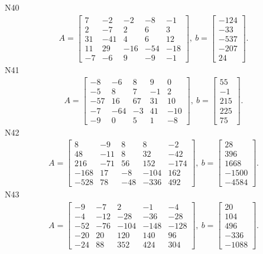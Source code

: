 \documentclass[11pt]{report}
\begin{document}
N40
\begin{align*}
 A = \left[\begin{matrix}7 & -2 & -2 & -8 & -1\\2 & -7 & 2 & 6 & 3\\31 & -41 & 4 & 6 & 12\\11 & 29 & -16 & -54 & -18\\-7 & -6 & 9 & -9 & -1\end{matrix}\right],
\ b = \left[\begin{matrix}-124\\-33\\-537\\-207\\24\end{matrix}\right]. 
 \end{align*}
N41
\begin{align*}
 A = \left[\begin{matrix}-8 & -6 & 8 & 9 & 0\\-5 & 8 & 7 & -1 & 2\\-57 & 16 & 67 & 31 & 10\\-7 & -64 & -3 & 41 & -10\\-9 & 0 & 5 & 1 & -8\end{matrix}\right],
\ b = \left[\begin{matrix}55\\-1\\215\\225\\75\end{matrix}\right]. 
 \end{align*}
N42
\begin{align*}
 A = \left[\begin{matrix}8 & -9 & 8 & 8 & -2\\48 & -11 & 8 & 32 & -42\\216 & -71 & 56 & 152 & -174\\-168 & 17 & -8 & -104 & 162\\-528 & 78 & -48 & -336 & 492\end{matrix}\right],
\ b = \left[\begin{matrix}28\\396\\1668\\-1500\\-4584\end{matrix}\right]. 
 \end{align*}
N43
\begin{align*}
 A = \left[\begin{matrix}-9 & -7 & 2 & -1 & -4\\-4 & -12 & -28 & -36 & -28\\-52 & -76 & -104 & -148 & -128\\-20 & 20 & 120 & 140 & 96\\-24 & 88 & 352 & 424 & 304\end{matrix}\right],
\ b = \left[\begin{matrix}20\\104\\496\\-336\\-1088\end{matrix}\right]. 
 \end{align*}
\end{document}

